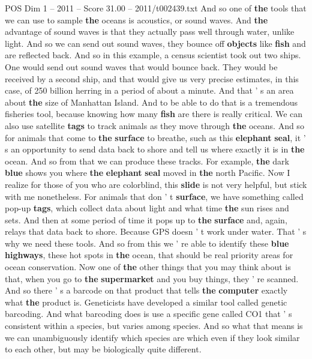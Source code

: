\begin{textsample}{POS Dim 1 – 2011 – Score 31.00 – 2011/t002439.txt}
And so one of \textbf{the} tools that we can use to sample \textbf{the} oceans is acoustics, or sound waves.
And \textbf{the} advantage of sound waves is that they actually pass well through water, unlike light.
And so we can send out sound waves, they bounce off \textbf{objects} like \textbf{fish} and are reflected back.
And so in this example, a census scientist took out two ships.
One would send out sound waves that would bounce back.
They would be received by a second ship, and that would give us very precise estimates, in this case, of 250 billion herring in a period of about a minute.
And that ' s an area about \textbf{the} size of Manhattan Island.
And to be able to do that is a tremendous fisheries tool, because knowing how many \textbf{fish} are there is really critical.
We can also use satellite \textbf{tags} to track animals as they move through \textbf{the} oceans.
And so for animals that come to \textbf{the} \textbf{surface} to breathe, such as this \textbf{elephant} \textbf{seal}, it ' s an opportunity to send data back to shore and tell us where exactly it is in \textbf{the} ocean.
And so from that we can produce these tracks.
For example, \textbf{the} dark \textbf{blue} shows you where \textbf{the} \textbf{elephant} \textbf{seal} moved in \textbf{the} north Pacific.
Now I realize for those of you who are colorblind, this \textbf{slide} is not very helpful, but stick with me nonetheless.
For animals that don ' t \textbf{surface}, we have something called pop-up \textbf{tags}, which collect data about light and what time \textbf{the} sun rises and sets.
And then at some period of time it pops up to \textbf{the} \textbf{surface} and, again, relays that data back to shore.
Because GPS doesn ' t work under water.
That ' s why we need these tools.
And so from this we ' re able to identify these \textbf{blue} \textbf{highways}, these hot spots in \textbf{the} ocean, that should be real priority areas for ocean conservation.
Now one of \textbf{the} other things that you may think about is that, when you go to \textbf{the} \textbf{supermarket} and you buy things, they ' re scanned.
And so there ' s a barcode on that product that tells \textbf{the} \textbf{computer} exactly what \textbf{the} product is.
Geneticists have developed a similar tool called genetic barcoding.
And what barcoding does is use a specific gene called CO1 that ' s consistent within a species, but varies among species.
And so what that means is we can unambiguously identify which species are which even if they look similar to each other, but may be biologically quite different.

\end{textsample}
